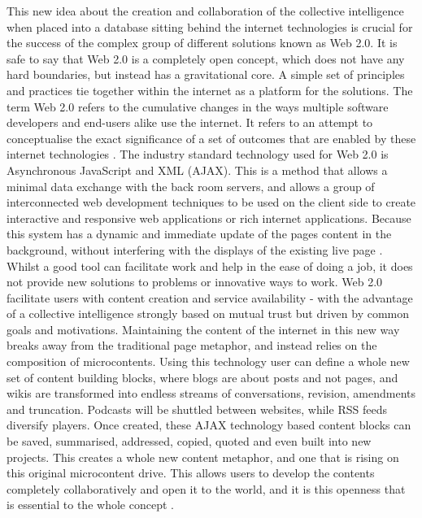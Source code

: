 This new idea about the creation and collaboration of the collective intelligence when placed into a database sitting behind the internet technologies is crucial for the success of the complex group of different solutions known as Web 2.0. It is safe to say that Web 2.0 is a completely open concept, which does not have any hard boundaries, but instead has a gravitational core. A simple set of principles and practices tie together within the internet as a platform for the solutions. The term Web 2.0 refers to the cumulative changes in the ways multiple software developers and end-users alike use the internet. It refers to an attempt to conceptualise the exact significance of a set of outcomes that are enabled by these internet technologies \cite{boateng2014web}. The industry standard technology used for Web 2.0 is Asynchronous JavaScript and XML (AJAX). This is a method that allows a minimal data exchange with the back room servers, and allows a group of interconnected web development techniques to be used on the client side to create interactive and responsive web applications or rich internet applications. Because this system has a dynamic and immediate update of the pages content in the background, without interfering with the displays of the existing live page \cite{webtim}. Whilst a good tool can facilitate work and help in the ease of doing a job, it does not provide new solutions to problems or innovative ways to work. Web 2.0 facilitate users with content creation and service availability - with the advantage of a collective intelligence strongly based on mutual trust but driven by common goals and motivations. Maintaining the content of the internet in this new way breaks away from the traditional page metaphor, and instead relies on the composition of microcontents. Using this technology user can define a whole new set of content building blocks, where blogs are about posts and not pages, and wikis are transformed into endless streams of conversations, revision, amendments and truncation. Podcasts will be shuttled between websites, while RSS feeds diversify players. Once created, these AJAX technology based content blocks can be saved, summarised, addressed, copied, quoted and even built into new projects. This creates a whole new content metaphor, and one that is rising on this original microcontent drive. This allows users to develop the contents completely collaboratively and open it to the world, and it is this openness that is essential to the whole concept \cite{mesbah2012crawling}. 

